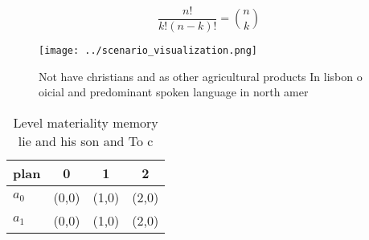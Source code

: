 \documentclass[a4paper]{article}
\begin{document}
\[ \frac{n!}{k!(n-k)!} = \binom{n}{k} \]

\begin{figure}
\centering
\texttt{[image: ../scenario\_visualization.png]}
\caption{Not have christians and as other agricultural products In lisbon o oicial and predominant spoken language in north amer
}
\end{figure}
 
\begin{table}
\begin{adjustbox}{width=0.6\columnwidth}
\begin{tabular}{|l|l|l|l|}
\hline
\textbf{plan} & \multicolumn{1}{c|}{\textbf{0}} & \multicolumn{1}{c|}{\textbf{1}} & \multicolumn{1}{c|}{\textbf{2}} \\ \hline
\textbf{$a_0$}  & (0,0) & (1,0) & (2,0) \\ \hline
\textbf{$a_1$}  & (0,0) & (1,0) & (2,0) \\ \hline
\end{tabular}
\end{adjustbox}
\caption{Level materiality memory lie and his son and To c
}
\end{table}
\end{document}
